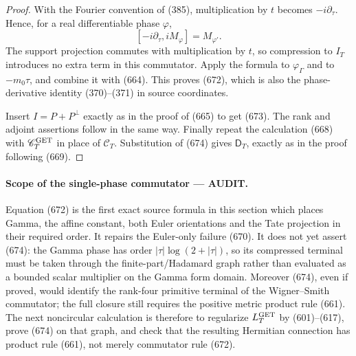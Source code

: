 \documentclass[11pt]{article}
\newcommand{\AUDIT}{\textcolor{orange!75!black}{\textbf{AUDIT}}}
\begin{document}
\begin{proof}
With the Fourier convention of (385), multiplication by \(t\) becomes
\(-i\partial_\tau\).  Hence, for a real differentiable phase \(\varphi\),
\[
 [-i\partial_\tau,iM_\varphi]=M_{\varphi'}.
\]
The support projection commutes with multiplication by \(t\), so
compression to \(I_T\) introduces no extra term in this commutator.
Apply the formula to \(\varphi_\Gamma\) and to \(-m_0\tau\), and combine
it with (664).  This proves (672), which is also the phase-derivative
identity (370)--(371) in source coordinates.

Insert \(I=P+P^\perp\) exactly as in the proof of (665) to get (673).
The rank and adjoint assertions follow in the same way.  Finally repeat the
calculation (668) with \(\mathscr C_T^{\rm GET}\) in place of
\(\mathscr C_T\).  Substitution of (674) gives \(\mathsf D_T\), exactly as
in the proof following (669).
\end{proof}

\paragraph{Scope of the single-phase commutator --- \AUDIT.}
Equation (672) is the first exact source formula in this section which
places Gamma, the affine constant, both Euler orientations and the Tate
projection in their required order.  It repairs the Euler-only failure
(670).  It does not yet assert (674): the Gamma phase has order
\(|\tau|\log(2+|\tau|)\), so its compressed terminal must be taken through
the finite-part/Hadamard graph rather than evaluated as a bounded scalar
multiplier on the Gamma form domain.  Moreover (674), even if proved, would
identify the rank-four primitive terminal of the Wigner--Smith commutator;
the full closure still requires the positive metric product rule (661).
The next noncircular calculation is therefore to regularize
\(L_T^{\rm GET}\) by (601)--(617), prove (674) on that graph, and check that
the resulting Hermitian connection has product rule (661), not merely
commutator rule (672).
\end{document}
